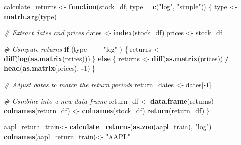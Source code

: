 \documentclass[
]{article}
\newenvironment{Shaded}{\begin{snugshade}}{\end{snugshade}}
\newcommand{\AttributeTok}[1]{\textcolor[rgb]{0.13,0.29,0.53}{#1}}
\newcommand{\CommentTok}[1]{\textcolor[rgb]{0.56,0.35,0.01}{\textit{#1}}}
\newcommand{\ControlFlowTok}[1]{\textcolor[rgb]{0.13,0.29,0.53}{\textbf{#1}}}
\newcommand{\DecValTok}[1]{\textcolor[rgb]{0.00,0.00,0.81}{#1}}
\newcommand{\FunctionTok}[1]{\textcolor[rgb]{0.13,0.29,0.53}{\textbf{#1}}}
\newcommand{\NormalTok}[1]{#1}
\newcommand{\OtherTok}[1]{\textcolor[rgb]{0.56,0.35,0.01}{#1}}
\newcommand{\SpecialCharTok}[1]{\textcolor[rgb]{0.81,0.36,0.00}{\textbf{#1}}}
\newcommand{\StringTok}[1]{\textcolor[rgb]{0.31,0.60,0.02}{#1}}
\begin{document}
\begin{Shaded}
\begin{Highlighting}[]
\NormalTok{calculate\_returns }\OtherTok{\textless{}{-}} \ControlFlowTok{function}\NormalTok{(stock\_df, }\AttributeTok{type =} \FunctionTok{c}\NormalTok{(}\StringTok{"log"}\NormalTok{, }\StringTok{"simple"}\NormalTok{)) \{}
\NormalTok{  type }\OtherTok{\textless{}{-}} \FunctionTok{match.arg}\NormalTok{(type)}

  \CommentTok{\# Extract dates and prices}
\NormalTok{  dates }\OtherTok{\textless{}{-}} \FunctionTok{index}\NormalTok{(stock\_df)}
\NormalTok{  prices }\OtherTok{\textless{}{-}}\NormalTok{ stock\_df}

  \CommentTok{\# Compute returns}
  \ControlFlowTok{if}\NormalTok{ (type }\SpecialCharTok{==} \StringTok{"log"}\NormalTok{ ) \{}
\NormalTok{    returns }\OtherTok{\textless{}{-}} \FunctionTok{diff}\NormalTok{(}\FunctionTok{log}\NormalTok{(}\FunctionTok{as.matrix}\NormalTok{(prices)))}
\NormalTok{  \} }\ControlFlowTok{else}\NormalTok{ \{}
\NormalTok{    returns }\OtherTok{\textless{}{-}} \FunctionTok{diff}\NormalTok{(}\FunctionTok{as.matrix}\NormalTok{(prices)) }\SpecialCharTok{/} \FunctionTok{head}\NormalTok{(}\FunctionTok{as.matrix}\NormalTok{(prices), }\SpecialCharTok{{-}}\DecValTok{1}\NormalTok{)}
\NormalTok{  \}}

  \CommentTok{\# Adjust dates to match the return periods}
\NormalTok{  return\_dates }\OtherTok{\textless{}{-}}\NormalTok{ dates[}\SpecialCharTok{{-}}\DecValTok{1}\NormalTok{]}

  \CommentTok{\# Combine into a new data frame}
\NormalTok{  return\_df }\OtherTok{\textless{}{-}} \FunctionTok{data.frame}\NormalTok{(returns)}
  \FunctionTok{colnames}\NormalTok{(return\_df) }\OtherTok{\textless{}{-}} \FunctionTok{colnames}\NormalTok{(stock\_df)}
  \FunctionTok{return}\NormalTok{(return\_df)}
\NormalTok{\}}
\end{Highlighting}
\end{Shaded}

\begin{Shaded}
\begin{Highlighting}[]
\NormalTok{aapl\_return\_train}\OtherTok{\textless{}{-}} \FunctionTok{calculate\_returns}\NormalTok{(}\FunctionTok{as.zoo}\NormalTok{(aapl\_train), }\StringTok{"log"}\NormalTok{)}
\FunctionTok{colnames}\NormalTok{(aapl\_return\_train)}\OtherTok{\textless{}{-}} \StringTok{"AAPL"}
\end{Highlighting}
\end{Shaded}
\end{document}
